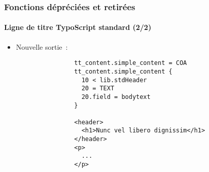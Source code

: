 
\begin{frame}[fragile]
	\frametitle{Fonctions dépréciées et retirées}
	\framesubtitle{Ligne de titre TypoScript standard (2/2)}

	\lstset{basicstyle=\tiny\ttfamily}

	\begin{itemize}

		\item Nouvelle sortie~:

			\begin{lstlisting}
				tt_content.simple_content = COA
				tt_content.simple_content {
				  10 < lib.stdHeader
				  20 = TEXT
				  20.field = bodytext
				}

				<header>
				  <h1>Nunc vel libero dignissim</h1>
				</header>
				<p>
				  ...
				</p>
			\end{lstlisting}

	\end{itemize}

\end{frame}


